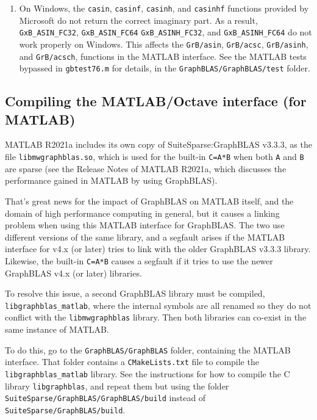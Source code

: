 \documentclass[12pt]{article}
\begin{document}
\begin{enumerate}
\item On Windows, the \verb'casin', \verb'casinf', \verb'casinh', and
    \verb'casinhf' functions provided by Microsoft do not return the correct
    imaginary part.  As a result, \verb'GxB_ASIN_FC32', \verb'GxB_ASIN_FC64'
    \verb'GxB_ASINH_FC32', and \verb'GxB_ASINH_FC64' do not work properly on
    Windows.  This affects the \verb'GrB/asin', \verb'GrB/acsc',
    \verb'GrB/asinh', and \verb'GrB/acsch', functions in the MATLAB interface.
    See the MATLAB tests bypassed in \verb'gbtest76.m' for details, in the
    \newline
    \verb'GraphBLAS/GraphBLAS/test' folder.

\end{enumerate}

\subsection{Compiling the MATLAB/Octave interface (for MATLAB)}
\label{R2021a}

MATLAB R2021a includes its own copy of SuiteSparse:GraphBLAS v3.3.3, as the
file \verb'libmwgraphblas.so', which is used for the built-in \verb'C=A*B' when
both \verb'A' and \verb'B' are sparse (see the Release Notes of MATLAB R2021a,
which discusses the performance gained in MATLAB by using GraphBLAS).

That's great news for the impact of GraphBLAS on MATLAB itself, and the domain
of high performance computing in general, but it causes a linking problem when
using this MATLAB interface for GraphBLAS.  The two use different versions of
the same library, and a segfault arises if the MATLAB interface for v4.x (or
later) tries to link with the older GraphBLAS v3.3.3 library.  Likewise, the
built-in \verb'C=A*B' causes a segfault if it tries to use the newer GraphBLAS
v4.x (or later) libraries.

To resolve this issue, a second GraphBLAS library must be compiled,
\verb'libgraphblas_matlab', where the internal symbols are all renamed so they
do not conflict with the \verb'libmwgraphblas' library.  Then both libraries
can co-exist in the same instance of MATLAB.

To do this, go to the \verb'GraphBLAS/GraphBLAS' folder, containing the
MATLAB interface.  That folder contains a \verb'CMakeLists.txt' file to
compile the \verb'libgraphblas_matlab' library.  See the instructions
for how to compile the C library \verb'libgraphblas', and repeat them but
using the folder \newline
\verb'SuiteSparse/GraphBLAS/GraphBLAS/build' instead of \newline
\verb'SuiteSparse/GraphBLAS/build'.
\end{document}
